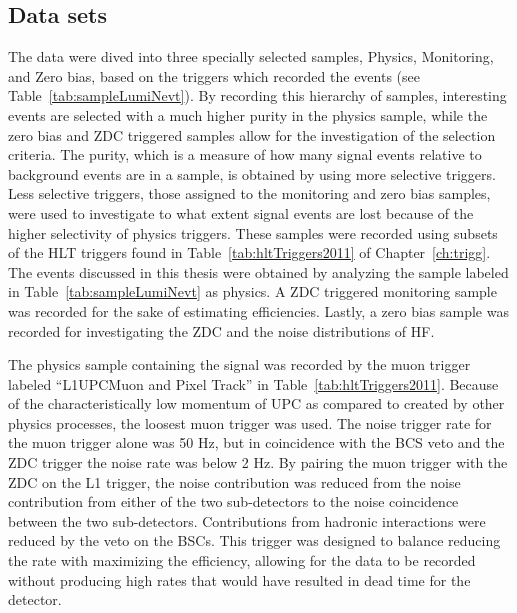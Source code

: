     \subsection{Data sets}
      The data were dived into three specially selected samples, Physics, Monitoring, 
        and Zero bias, based on the triggers which recorded the events (see 
        Table~\ref{tab:sampleLumiNevt}).
      By recording this hierarchy of samples, interesting events are selected 
        with a much higher purity in the physics sample, while the zero bias 
        and ZDC triggered samples allow for the investigation of the selection 
        criteria. 
      The purity, which is a measure of how many signal events relative to
        background events are in a sample, is obtained by using more selective
        triggers.
      Less selective triggers, those assigned to the monitoring and zero bias 
        samples, were used to investigate to what extent signal events are lost
        because of the higher selectivity of physics triggers. 
      These samples were recorded using subsets of the HLT triggers found in 
        Table~\ref{tab:hltTriggers2011} of Chapter~\ref{ch:trigg}.
      The \JPsi{} events discussed in this thesis were obtained by analyzing 
        the sample labeled in Table~\ref{tab:sampleLumiNevt} as physics.
      A ZDC triggered monitoring sample was recorded for the sake of estimating
        efficiencies.
      Lastly, a zero bias sample was recorded for investigating the ZDC and the 
        noise distributions of HF.

      The physics sample containing the \JPsi{} signal was recorded by the muon 
        trigger labeled ``L1UPCMuon and Pixel Track'' in 
        Table~\ref{tab:hltTriggers2011}. 
      Because of the characteristically low momentum of UPC \JPsi{} as compared
        to \JPsi{} created by other physics processes, the loosest muon 
        trigger was used.
      The noise trigger rate for the muon trigger alone was 50 Hz, but in 
        coincidence with the BCS veto and the ZDC trigger the noise rate was
        below 2 Hz. 
      By pairing the muon trigger with the ZDC on the L1 trigger, the noise contribution
        was reduced from the noise contribution from either of the two 
        sub-detectors to the noise coincidence between the two sub-detectors. 
      Contributions from hadronic interactions were reduced by the veto on the 
        BSCs.
      This trigger was designed to balance reducing the rate with maximizing 
        the efficiency, allowing for the data to be recorded without 
        producing high rates that would have resulted in dead time for the 
        detector.  


